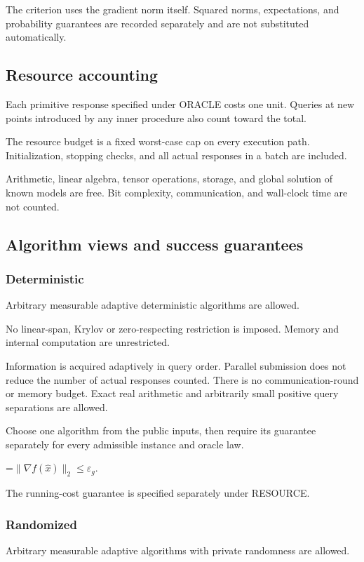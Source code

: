 \documentclass[10pt,a4paper]{article}
\newcommand{\AtlasMath}[1]{\par\begingroup\centering\setbox0=\hbox{$\displaystyle #1$}\ifdim\wd0>1.4\linewidth\typeout{ATLAS WIDE FORMULA: \the\wd0}\fi\ifdim\wd0>\linewidth\resizebox{\linewidth}{!}{\box0}\else\box0\fi\par\endgroup}
\begin{document}
The criterion uses the gradient norm itself. Squared norms, expectations, and probability guarantees are recorded separately and are not substituted automatically.

\subsection{Resource accounting}
Each primitive response specified under ORACLE costs one unit. Queries at new points introduced by any inner procedure also count toward the total.

The resource budget is a fixed worst-case cap on every execution path. Initialization, stopping checks, and all actual responses in a batch are included.

Arithmetic, linear algebra, tensor operations, storage, and global solution of known models are free. Bit complexity, communication, and wall-clock time are not counted.

\subsection{Algorithm views and success guarantees}
\subsubsection{Deterministic}
Arbitrary measurable adaptive deterministic algorithms are allowed.

No linear-span, Krylov or zero-respecting restriction is imposed. Memory and internal computation are unrestricted.

Information is acquired adaptively in query order. Parallel submission does not reduce the number of actual responses counted. There is no communication-round or memory budget. Exact real arithmetic and arbitrarily small positive query separations are allowed.

Choose one algorithm from the public inputs, then require its guarantee separately for every admissible instance and oracle law.


\AtlasMath{\|\nabla f(\widehat{x})\|_2\le \varepsilon_g.}


The running-cost guarantee is specified separately under RESOURCE.

\subsubsection{Randomized}
Arbitrary measurable adaptive algorithms with private randomness are allowed.
\end{document}
